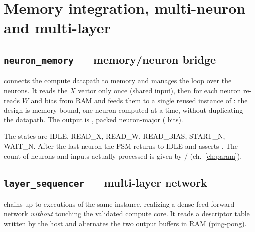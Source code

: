 \chapter[Memory, multi-neuron and multi-layer]{Memory integration, multi-neuron and multi-layer}
\label{ch:seq}

\section{\texttt{neuron\_memory} --- memory/neuron bridge}
 connects the compute datapath to memory and manages the loop over
the neurons. It reads the $X$ vector only once (shared input), then for each neuron
re-reads $W$ and bias from RAM and feeds them to a single reused instance of
: the design is memory-bound, one neuron computed at a time,
without duplicating the datapath. The output is , packed neuron-major
( bits).

\begin{center}
\end{center}

The states are IDLE, READ\_X, READ\_W, READ\_BIAS, START\_N, WAIT\_N. After the last
neuron the FSM returns to IDLE and asserts . The count of neurons and inputs
actually processed is given by /
(ch.~\ref{ch:param}).

\section{\texttt{layer\_sequencer} --- multi-layer network}
 chains up to  executions of the same
 instance, realizing a dense feed-forward network \emph{without}
touching the validated compute core. It reads a descriptor table written by the host and
alternates the two output buffers in RAM (ping-pong).

